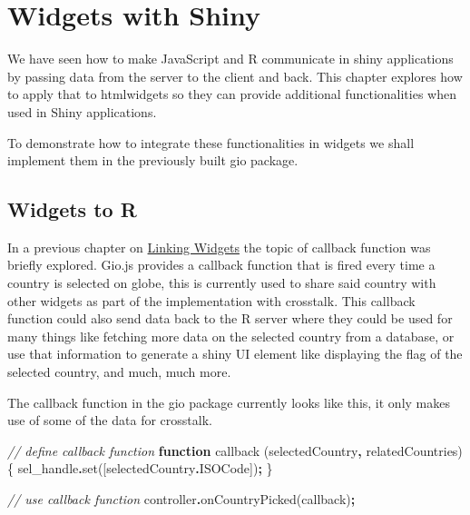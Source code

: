 \documentclass[
]{krantz}
\makeatletter
\newenvironment{Shaded}{\begin{snugshade}}{\end{snugshade}}
\newcommand{\AttributeTok}[1]{\textcolor[rgb]{0.61,0.61,0.61}{#1}}
\newcommand{\CommentTok}[1]{\textcolor[rgb]{0.37,0.37,0.37}{\textit{#1}}}
\newcommand{\FunctionTok}[1]{\textcolor[rgb]{0,0,0}{#1}}
\newcommand{\KeywordTok}[1]{\textcolor[rgb]{0.27,0.27,0.27}{\textbf{#1}}}
\newcommand{\NormalTok}[1]{#1}
\newcommand{\OperatorTok}[1]{\textcolor[rgb]{0.43,0.43,0.43}{\textbf{#1}}}
\newenvironment{kframe}{%
\medskip{}
\setlength{\fboxsep}{.8em}
 \def\at@end@of@kframe{}%
 \ifinner\ifhmode%
  \def\at@end@of@kframe{\end{minipage}}%
  \begin{minipage}{\columnwidth}%
 \fi\fi%
 \def\FrameCommand##1{\hskip\@totalleftmargin \hskip-\fboxsep
 \colorbox{shadecolor}{##1}\hskip-\fboxsep
     \hskip-\linewidth \hskip-\@totalleftmargin \hskip\columnwidth}%
 \MakeFramed {\advance\hsize-\width
   \@totalleftmargin\z@ \linewidth\hsize
   \@setminipage}}%
 {\par\unskip\endMakeFramed%
 \at@end@of@kframe}
\renewenvironment{Shaded}{\begin{kframe}}{\end{kframe}}
\makeatother
\begin{document}
\hypertarget{shiny-widgets}{%
\chapter{Widgets with Shiny}\label{shiny-widgets}}

We have seen how to make JavaScript and R communicate in shiny applications by passing data from the server to the client and back. This chapter explores how to apply that to htmlwidgets so they can provide additional functionalities when used in Shiny applications.

To demonstrate how to integrate these functionalities in widgets we shall implement them in the previously built gio package.

\hypertarget{shiny-widgets-to-r}{%
\section{Widgets to R}\label{shiny-widgets-to-r}}

In a previous chapter on \protect\hyperlink{linking-widgets}{Linking Widgets} the topic of callback function was briefly explored. Gio.js provides a callback function that is fired every time a country is selected on globe, this is currently used to share said country with other widgets as part of the implementation with crosstalk. This callback function could also send data back to the R server where they could be used for many things like fetching more data on the selected country from a database, or use that information to generate a shiny UI element like displaying the flag of the selected country, and much, much more.

The callback function in the gio package currently looks like this, it only makes use of some of the data for crosstalk.

\begin{Shaded}
\begin{Highlighting}[]
\CommentTok{// define callback function}
\KeywordTok{function} \FunctionTok{callback}\NormalTok{ (selectedCountry}\OperatorTok{,}\NormalTok{ relatedCountries) \{}
\NormalTok{  sel\_handle}\OperatorTok{.}\FunctionTok{set}\NormalTok{([selectedCountry}\OperatorTok{.}\AttributeTok{ISOCode}\NormalTok{])}\OperatorTok{;}
\NormalTok{\}}

\CommentTok{// use callback function}
\NormalTok{controller}\OperatorTok{.}\FunctionTok{onCountryPicked}\NormalTok{(callback)}\OperatorTok{;}
\end{Highlighting}
\end{Shaded}
\end{document}
